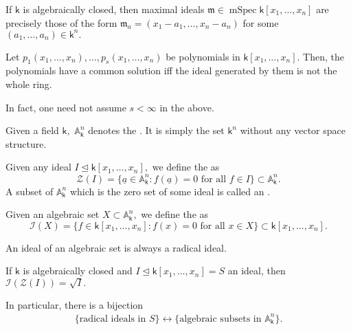 \documentclass[12pt]{article}	%
\DeclareMathOperator{\mSpec}{mSpec}
\begin{document}
\begin{thm}
	If $\mathsf{k}$ is algebraically closed, then maximal ideals $\mathfrak{m} \in \mSpec \mathsf{k}[x_1, \ldots, x_n]$ are precisely those of the form $\mathfrak{m}_a = (x_1 - a_1, \ldots, x_n - a_n)$ for some $(a_1, \ldots, a_n) \in \mathsf{k}^n.$
\end{thm}

\begin{cor}
	Let $p_1(x_1, \ldots, x_n), \ldots, p_s(x_1, \ldots, x_n)$ be polynomials in $\mathsf{k}[x_1, \ldots, x_n].$ Then, the polynomials have a common solution iff the ideal generated by them is not the whole ring.
\end{cor}
\begin{rem}
	In fact, one need not assume $s < \infty$ in the above.	
\end{rem}

\begin{defn}%
	Given a field $\mathsf{k},$ $\mathbb{A}_\mathsf{k}^n$ denotes the . It is simply the set $\mathsf{k}^n$ without any vector space structure.

	Given any ideal $I \unlhd \mathsf{k}[x_1, \ldots, x_n],$ we define the  as
	\begin{equation*} 
		\mathcal{Z}(I) = \{\underline{a} \in \mathbb{A}_\mathsf{k}^n : f(\underline{a}) = 0 \text{ for all } f \in I\} \subset \mathbb{A}_\mathsf{k}^n.
	\end{equation*}
	A subset of $\mathbb{A}_\mathsf{k}^n$ which is the zero set of some ideal is called an .

	Given an algebraic set $X \subset \mathbb{A}_\mathsf{k}^n,$ we define the  as
	\begin{equation*} 
		\mathcal{I}(X) = \{f \in \mathsf{k}[x_1, \ldots, x_n] : f(x) = 0 \text{ for all } x \in X\} \subset \mathsf{k}[x_1, \ldots, x_n].
	\end{equation*}
\end{defn}

\begin{rem}
	An ideal of an algebraic set is always a radical ideal.	
\end{rem}

\begin{thm}
	If $\mathsf{k}$ is algebraically closed and $I \unlhd \mathsf{k}[x_1, \ldots, x_n] = S$ an ideal, then $\mathcal{I}(\mathcal{Z}(I)) = \sqrt{I}.$

	In particular, there is a bijection
	\begin{align*} 
		\{\text{radical ideals in } S\} \leftrightarrow \{\text{algebraic subsets in }\mathbb{A}_\mathsf{k}^n\}.
	\end{align*}
\end{thm}
\end{document}
